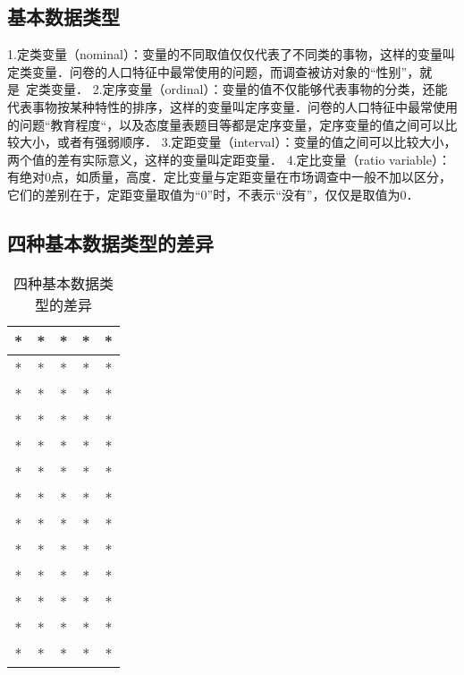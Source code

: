 \subsection{基本数据类型}
1.定类变量（nominal）：变量的不同取值仅仅代表了不同类的事物，这样的变量叫定类变量．问卷的人口特征中最常使用的问题，而调查被访对象的“性别”，就是 定类变量．
2.定序变量（ordinal）：变量的值不仅能够代表事物的分类，还能代表事物按某种特性的排序，这样的变量叫定序变量．问卷的人口特征中最常使用的问题“教育程度“，以及态度量表题目等都是定序变量，定序变量的值之间可以比较大小，或者有强弱顺序．
3.定距变量（interval）：变量的值之间可以比较大小，两个值的差有实际意义，这样的变量叫定距变量．
4.定比变量（ratio variable）：有绝对0点，如质量，高度．定比变量与定距变量在市场调查中一般不加以区分，它们的差别在于，定距变量取值为“0”时，不表示“没有”，仅仅是取值为0．
\subsection{四种基本数据类型的差异}
\begin{table}[ht]
\centering
\caption{四种基本数据类型的差异}\label{DatTyp_tab1}
\begin{tabular}{|c|c|c|c|c|}
\hline
* & * & * & * & * \\
\hline
* & * & * & * & * \\
\hline
* & * & * & * & * \\
\hline
* & * & * & * & * \\
\hline
* & * & * & * & * \\
\hline
* & * & * & * & * \\
\hline
* & * & * & * & * \\
\hline
* & * & * & * & * \\
\hline
* & * & * & * & * \\
\hline
* & * & * & * & * \\
\hline
* & * & * & * & * \\
\hline
* & * & * & * & * \\
\hline
* & * & * & * & * \\
\hline
\end{tabular}
\end{table}
